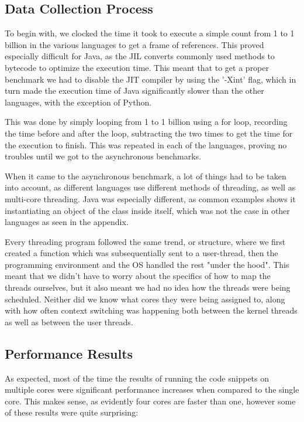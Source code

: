 \documentclass[12pt,a4paper]{article}
\begin{document}
\subsection{Data Collection Process}

To begin with, we clocked the time it took to execute a simple count from 1 to 1 billion in the various languages to get a frame of references. This proved especially difficult for Java, as the JIL converts commonly used methods to bytecode to optimize the execution time. This meant that to get a proper benchmark we had to disable the JIT compiler by using the '-Xint' flag, which in turn made the execution time of Java significantly slower than the other languages, with the exception of Python.

This was done by simply looping from 1 to 1 billion using a for loop, recording the time before and after the loop, subtracting the two times to get the time for the execution to finish. This was repeated in each of the languages, proving no troubles until we got to the asynchronous benchmarks.

When it came to the asynchronous benchmark, a lot of things had to be taken into account, as different languages use different methods of threading, as well as multi-core threading. Java was especially different, as common examples shows it instantiating an object of the class inside itself, which was not the case in other languages as seen in the appendix. 

Every threading program followed the same trend, or structure, where we first created a function which was subsequentially sent to a user-thread, then the programming environment and the OS handled the rest "under the hood". This meant that we didn't have to worry about the specifics of how to map the threads ourselves, but it also meant we had no idea how the threads were being scheduled. Neither did we know what cores they were being assigned to, along with how often context switching was happening both between the kernel threads as well as between the user threads. 

\subsection{Performance Results}

As expected, most of the time the results of running the code snippets on multiple cores were significant performance increases when compared to the single core. This makes sense, as evidently four cores are faster than one, however some of these results were quite surprising:
\end{document}
